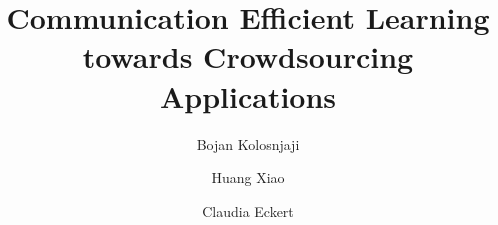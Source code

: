 \documentclass{llncs}
\begin{document}
%
\frontmatter          %
%
%
\mainmatter              %
%
\title{Communication Efficient Learning towards Crowdsourcing Applications}
%
%
\author{Bojan  Kolosnjaji \and Huang Xiao 
	\and Claudia Eckert }
%
%
%

\maketitle              %
\end{document}
